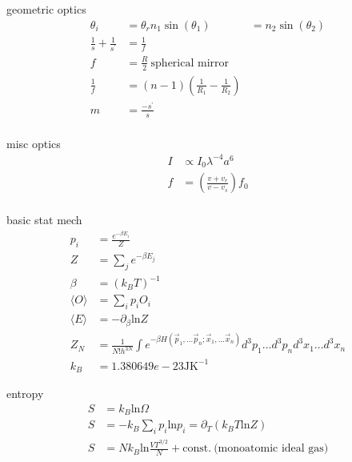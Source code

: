 \documentclass[avery5388, frame, grid]{flashcards}
\begin{document}
\begin{flashcard}{geometric optics}
  {
    \begin{align*}
      \theta_{i} &= \theta_{r}
      n_{1} \sin(\theta_{1}) &= n_{2} \sin(\theta_{2})\\
      \frac{1}{s} + \frac{1}{s^{'}} &= \frac{1}{f}\\
      f &= \frac{R}{2} \ \textrm{spherical mirror}\\
      \frac{1}{f} &= (n - 1) (\frac{1}{R_{1}} - \frac{1}{R_{2}})\\
      m &= \frac{- s^{'}}{s}\\
    \end{align*}
  }
\end{flashcard}

\begin{flashcard}{misc optics}
  {
    \begin{align*}
      I &\propto I_{0} \lambda^{-4}a^{6}\\
      f &= (\frac{v + v_{r}}{v - v_{s}}) f_{0}\\
    \end{align*}
  }
\end{flashcard}


\begin{flashcard}{basic stat mech}
  {
    \begin{align*}
      p_{i} &= \frac{e^{- \beta E_{i}}}{Z}\\
      Z &= \sum_{j} e^{-\beta E_{j}}\\
      \beta &= (k_{B} T)^{-1}\\
      \langle O \rangle &= \sum_{i} p_{i} O_{i}\\
      \langle E \rangle &= - \partial_{\beta} \textrm{ln} Z\\
      Z_{N} &= \frac{1}{N! h^{3N}} \int e^{-\beta H(\vec{p}_{1},...\vec{p}_{n};\vec{x}_{1},...\vec{x}_{n})} d^{3}p_{1}...d^{3}p_{n} d^{3}x_{1}...d^{3}x_{n}\\
      k_{B} &= 1.380 649 e-23 \textrm{J} \textrm{K}^{-1}
    \end{align*}
  }
\end{flashcard}

\begin{flashcard}{entropy}
  {
    \begin{align*}
      S &= k_{B} \textrm{ln} \Omega\\
      S &= - k_{B} \sum_{i} p_{i} \textrm{ln} p_{i} = \partial_{T}(k_{B} T \textrm{ln} Z)\\
      S &= N k_{B} \textrm{ln} \frac{V T^{3/2}}{N} + \textrm{const.} \ \textrm{(monoatomic ideal gas)}
    \end{align*}
  }
\end{flashcard}
\end{document}
